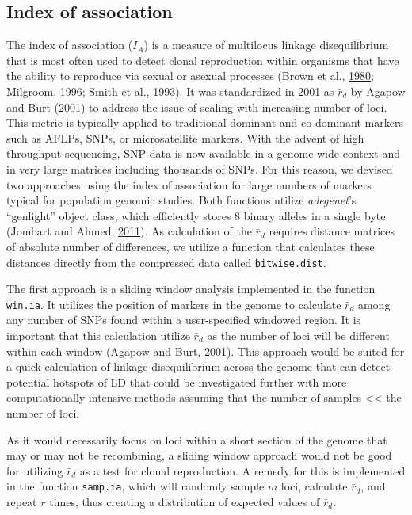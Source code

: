 \documentclass[double,12pt]{beavtex}
\begin{document}
  \subsection{Index of association}\label{index-of-association-1}
  
  The index of association (\(I_A\)) is a measure of multilocus linkage
  disequilibrium that is most often used to detect clonal reproduction
  within organisms that have the ability to reproduce via sexual or
  asexual processes (Brown et al.,
  \protect\hyperlink{ref-brown1980multilocus}{1980}; Milgroom,
  \protect\hyperlink{ref-milgroom1996recombination}{1996}; Smith et al.,
  \protect\hyperlink{ref-smith1993how}{1993}). It was standardized in 2001
  as \(\bar{r}_d\) by Agapow and Burt
  (\protect\hyperlink{ref-Agapow_2001}{2001}) to address the issue of
  scaling with increasing number of loci. This metric is typically applied
  to traditional dominant and co-dominant markers such as AFLPs, SNPs, or
  microsatellite markers. With the advent of high throughput sequencing,
  SNP data is now available in a genome-wide context and in very large
  matrices including thousands of SNPs. For this reason, we devised two
  approaches using the index of association for large numbers of markers
  typical for population genomic studies. Both functions utilize
  \emph{adegenet}'s ``genlight'' object class, which efficiently stores 8
  binary alleles in a single byte (Jombart and Ahmed,
  \protect\hyperlink{ref-jombart2011adegenet}{2011}). As calculation of
  the \(\bar{r}_d\) requires distance matrices of absolute number of
  differences, we utilize a function that calculates these distances
  directly from the compressed data called \texttt{bitwise.dist}.
  
  The first approach is a sliding window analysis implemented in the
  function \texttt{win.ia}. It utilizes the position of markers in the
  genome to calculate \(\bar{r}_d\) among any number of SNPs found within
  a user-specified windowed region. It is important that this calculation
  utilize \(\bar{r}_d\) as the number of loci will be different within
  each window (Agapow and Burt,
  \protect\hyperlink{ref-Agapow_2001}{2001}). This approach would be
  suited for a quick calculation of linkage disequilibrium across the
  genome that can detect potential hotspots of LD that could be
  investigated further with more computationally intensive methods
  assuming that the number of samples \textless{}\textless{} the number of
  loci.
  
  As it would necessarily focus on loci within a short section of the
  genome that may or may not be recombining, a sliding window approach
  would not be good for utilizing \(\bar{r}_d\) as a test for clonal
  reproduction. A remedy for this is implemented in the function
  \texttt{samp.ia}, which will randomly sample \(m\) loci, calculate
  \(\bar{r}_d\), and repeat \(r\) times, thus creating a distribution of
  expected values of \(\bar{r}_d\).
  
\end{document}
